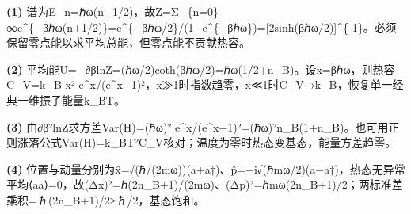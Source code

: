 \par\noindent\textbf{(1)} 谱为E\_n=ℏω(n+1/2)，故Z=Σ\_\{n=0\}∞e\textasciicircum{}\{−βℏω(n+1/2)\}=e\textasciicircum{}\{−βℏω/2\}/(1−e\textasciicircum{}\{−βℏω\})=[2sinh(βℏω/2)]\textasciicircum{}\{-1\}。必须保留零点能以求平均总能，但零点能不贡献热容。
\par\noindent\textbf{(2)} 平均能U=−∂βlnZ=(ℏω/2)coth(βℏω/2)=ℏω(1/2+n\_B)。设x=βℏω，则热容C\_V=k\_B x² e\textasciicircum{}x/(e\textasciicircum{}x−1)²，x≫1时指数趋零，x≪1时C\_V→k\_B，恢复单一经典一维振子能量k\_BT。
\par\noindent\textbf{(3)} 由∂β²lnZ求方差Var(H)=(ℏω)² e\textasciicircum{}x/(e\textasciicircum{}x−1)²=(ℏω)²n\_B(1+n\_B)。也可用正则涨落公式Var(H)=k\_BT²C\_V核对；温度为零时热态变基态，能量方差趋零。
\par\noindent\textbf{(4)} 位置与动量分别为x̂=√(ℏ/(2mω))(a+a†)、p̂=−i√(ℏmω/2)(a−a†)，热态无异常平均⟨aa⟩=0，故(Δx)²=ℏ(2n\_B+1)/(2mω)、(Δp)²=ℏmω(2n\_B+1)/2；两标准差乘积=ℏ(2n\_B+1)/2≥ℏ/2，基态饱和。
